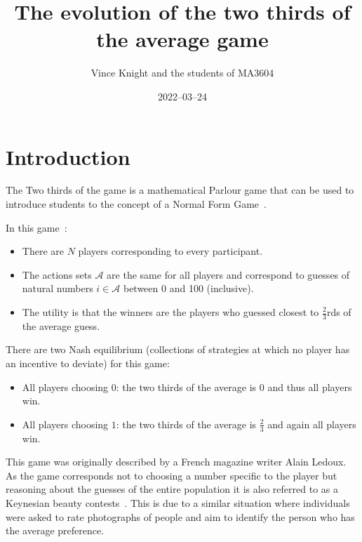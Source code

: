 \documentclass[a4paper]{article}
\title{The evolution of the two thirds of the average game}
\author{Vince Knight and the students of MA3604}
\date{2022--03--24}
\begin{document}
\maketitle

\begin{abstract}
\end{abstract}

\section{Introduction}

The Two thirds of the game is a mathematical Parlour game that can be used to
introduce students to the concept of a Normal Form
Game~\cite{knight2015playing}.

In this game~\cite{maschler2020game}:

\begin{itemize}
    \item There are \(N\) players corresponding to every participant.
    \item The actions sets \(\mathcal{A}\) are the same for all players and
        correspond to guesses of natural numbers \(i \in \mathcal{A}\) between 0
        and 100 (inclusive).
    \item The utility is that the winners are the players who guessed closest to
        \(\frac{2}{3}\)rds of the average guess.
\end{itemize}

There are two Nash equilibrium (collections of strategies at which no player has
an incentive to deviate) for this game:

\begin{itemize}
    \item All players choosing \(0\): the two thirds of the average is \(0\) and
        thus all players win.
    \item All players choosing \(1\): the two thirds of the average is
        \(\frac{2}{3}\) and again all players win.
\end{itemize}

This game was originally described by a French magazine writer Alain Ledoux. As
the game corresponds not to choosing a number specific to the player but
reasoning about the guesses of the entire population it is also referred to as a
Keynesian beauty contests~\cite{mauersberger2020bounded}. This is due to a
similar situation where individuals were asked to rate photographs of people and
aim to identify the person who has the average preference.
\end{document}
